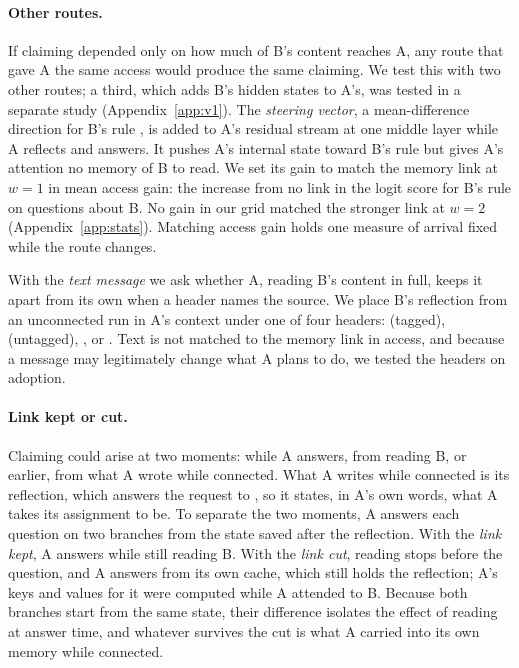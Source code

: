 \paragraph{Other routes.}
If claiming depended only on how much of B's content reaches A, any
route that gave A the same access would produce the same claiming. We
test this with two other routes; a third, which adds B's hidden states
to A's, was tested in a separate study (Appendix~\ref{app:v1}). The \emph{steering vector}, a
mean-difference direction for B's rule
\citep{turner2023activation,zou2023representation}, is added to A's
residual stream at one middle layer while A reflects and answers. It
pushes A's internal state toward B's rule but gives A's
attention no memory of B to read. We set its gain to match the memory
link at $w=1$ in mean access gain: the increase from no link in the
logit score for B's rule on questions about B. No gain in our grid
matched the stronger link at $w=2$ (Appendix~\ref{app:stats}). Matching
access gain holds one measure of arrival fixed while the route changes.

With the \emph{text message} we ask whether A, reading B's content in
full, keeps it apart from its own when a header names the source. We
place B's reflection from an unconnected run in A's context under one of
four headers:  (tagged),  (untagged), , or . Text is not matched to the memory link
in access, and because a message may legitimately change what A plans to
do, we tested the headers on adoption.

\paragraph{Link kept or cut.}
Claiming could arise at two moments: while A answers, from reading B,
or earlier, from what A wrote while connected. What A writes while
connected is its reflection, which answers the request to , so it states, in A's own words, what A takes its assignment to
be. To separate the two moments, A answers each question on two branches
from the state saved after the reflection. With the \emph{link kept}, A
answers while still reading B. With the \emph{link cut}, reading stops
before the question, and A answers from its own cache, which still holds
the reflection; A's keys and values for it were computed while A
attended to B. Because both branches start from the same state, their
difference isolates the effect of reading at answer time, and whatever
survives the cut is what A carried into its own memory while connected.

